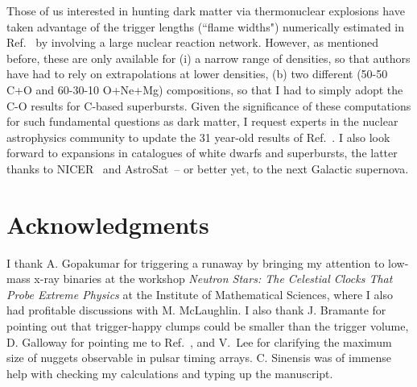 \documentclass[
    twocolumn,
	prd,
        amssymb,
	preprintnumbers,
	secnumarabic,
	nofootinbib,
	superscriptaddress]{revtex4-1}
\begin{document}
Those of us interested in hunting dark matter via thermonuclear explosions have taken advantage of the trigger lengths (``flame widths") numerically estimated in Ref.~\cite{TimmesWoosley1992} by involving a large nuclear reaction network.
However, as mentioned before, these are only available for (i) a narrow range of densities, so that authors have had to rely on extrapolations at lower densities, (b) two different (50-50 C+O and 60-30-10 O+Ne+Mg) compositions, so that I had to simply adopt the C-O results for C-based superbursts. 
Given the significance of these computations for such fundamental questions as dark matter, I request experts in the nuclear astrophysics community to update the 31 year-old results of Ref.~\cite{TimmesWoosley1992}.
I also look forward to expansions in catalogues of white dwarfs and superbursts, the latter thanks to NICER~\cite{supburst:NICERearly} and AstroSat~\cite{supburst:Astrosat}-- or better yet, to the next Galactic supernova.

 
\section*{Acknowledgments}

I thank A. Gopakumar for triggering a runaway by bringing my attention to low-mass x-ray binaries at the workshop {\em Neutron Stars: The Celestial Clocks That Probe Extreme Physics} at the Institute of Mathematical Sciences, where  I also had profitable discussions with M. McLaughlin. 
I also thank 
J. Bramante for pointing out that trigger-happy clumps could be smaller than the trigger volume,
D. Galloway for pointing me to Ref.~\cite{supburst:catalog2023},
and V.~Lee for clarifying the maximum size of nuggets observable in pulsar timing arrays.
C. Sinensis was of immense help with checking my calculations and typing up the manuscript.



\end{document}
